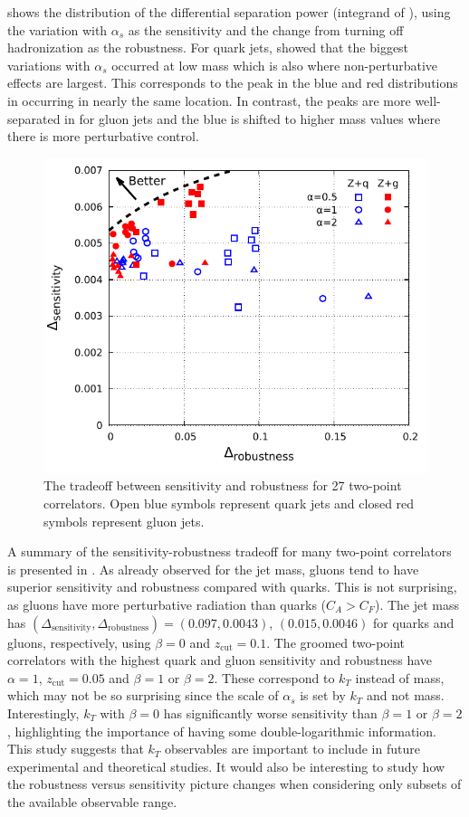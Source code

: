  shows the distribution of the differential separation power (integrand of ), using the variation with $\alpha_s$ as the sensitivity and the change from turning off hadronization as the robustness.
%
For quark jets,  showed that the biggest variations with $\alpha_s$ occurred at low mass which is also where non-perturbative effects are largest.
%
This corresponds to the peak in the blue and red distributions in  occurring in nearly the same location.
%
In contrast, the peaks are more well-separated in  for gluon jets and the blue is shifted to higher mass values where there is more perturbative control.  

\begin{figure}[t]
\begin{center}
\includegraphics[width = 0.6\columnwidth]{figures/robsep.pdf}
\end{center}
\caption{The tradeoff between sensitivity and robustness for 27 two-point correlators.  Open blue symbols represent quark jets and closed red symbols represent gluon jets.}
\label{fig:robseptradeoff}
\end{figure}

A summary of the sensitivity-robustness tradeoff for many two-point correlators is presented in .  As already observed for the jet mass, gluons tend to have superior sensitivity and robustness compared with quarks.
%
This is not surprising, as gluons have more perturbative radiation than quarks ($C_A>C_F$).
%
The jet mass has $(\Delta_\text{sensitivity},\Delta_\text{robustness})=(0.097,0.0043)$, $(0.015,0.0046)$ for quarks and gluons, respectively, using $\beta=0$ and $z_\text{cut}=0.1$.
%
The groomed two-point correlators with the highest quark and gluon sensitivity and robustness have $\alpha=1$, $z_\text{cut}=0.05$ and $\beta=1$ or $\beta=2$.
%
These correspond to $k_T$ instead of mass, which may not be so surprising since the scale of $\alpha_s$ is set by $k_T$ and not mass.
%
Interestingly, $k_T$ with $\beta=0$ has significantly worse sensitivity than $\beta=1$ or $\beta=2$, highlighting the importance of having some double-logarithmic information. 
%
This study suggests that $k_T$ observables are important to include in future experimental and theoretical studies.
%
It would also be interesting to study how the robustness versus sensitivity picture changes when considering only subsets of the available observable range.

